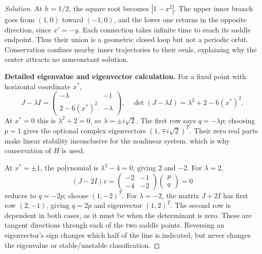 \documentclass[10pt]{amsart}
\newenvironment{solution}
{\begin{proof}[Solution]}
{\end{proof}}
\begin{document}
\begin{enumerate}[label=\arabic*), leftmargin=*, itemsep=1em]
\begin{solution}
At $h=1/2$, the square root becomes $|1-x^2|$. The upper inner branch goes from $(1,0)$ toward $(-1,0)$, and the lower one returns in the opposite direction, since $x'=-y$. Each connection takes infinite time to reach its saddle endpoint. Thus their union is a geometric closed loop but not a periodic orbit. Conservation confines nearby inner trajectories to their ovals, explaining why the center attracts no nonconstant solution.


\medskip\noindent\textbf{Detailed eigenvalue and eigenvector calculation.}
For a fixed point with horizontal coordinate $x^*$,
\[
J-\lambda I=\begin{pmatrix}-\lambda&-1\\2-6(x^*)^2&-\lambda\end{pmatrix},
\quad\det(J-\lambda I)=\lambda^2+2-6(x^*)^2.
\]
At $x^*=0$ this is $\lambda^2+2=0$, so $\lambda=\pm i\sqrt2$. The first row says $q=-\lambda p$; choosing $p=1$ gives the optional complex eigenvectors $(1,\mp i\sqrt2)^T$. Their zero real parts make linear stability inconclusive for the nonlinear system, which is why conservation of $H$ is used.

At $x^*=\pm1$, the polynomial is $\lambda^2-4=0$, giving $2$ and $-2$. For $\lambda=2$,
\[
(J-2I)v=\begin{pmatrix}-2&-1\\-4&-2\end{pmatrix}\begin{pmatrix}p\\q\end{pmatrix}=0
\]
reduces to $q=-2p$; choose $(1,-2)^T$. For $\lambda=-2$, the matrix $J+2I$ has first row $(2,-1)$, giving $q=2p$ and eigenvector $(1,2)^T$. The second row is dependent in both cases, as it must be when the determinant is zero. These are tangent directions through each of the two saddle points. Reversing an eigenvector's sign changes which half of the line is indicated, but never changes the eigenvalue or stable/unstable classification.


\end{solution}
\end{enumerate}
\end{document}
